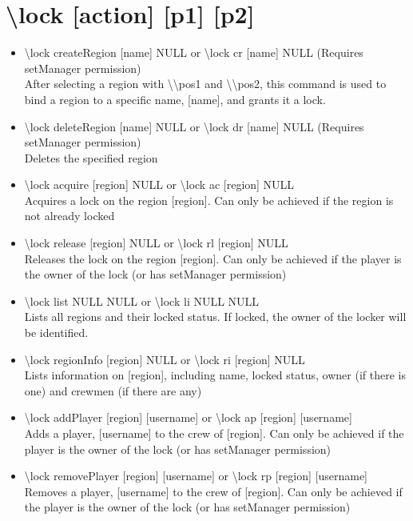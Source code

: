 \documentclass[a4paper,twoside,notitlepage,11pt]{article}
\begin{document}
\section{\textbackslash lock [action] [p1] [p2]}
\begin{itemize}
\item \textbackslash lock createRegion [name] NULL or \textbackslash lock cr [name] NULL (Requires setManager permission)\\
After selecting a region with \textbackslash\textbackslash pos1 and \textbackslash\textbackslash pos2, this command is used to bind a region to a specific name, [name], and grants it a lock.
\item \textbackslash lock deleteRegion [name] NULL or \textbackslash lock dr [name] NULL (Requires setManager permission)\\
Deletes the specified region
\item \textbackslash lock acquire [region] NULL or \textbackslash lock ac [region] NULL\\
Acquires a lock on the region [region]. Can only be achieved if the region is not already locked
\item \textbackslash lock release [region] NULL or \textbackslash lock rl [region] NULL\\
Releases the lock on the region [region]. Can only be achieved if the player is the owner of the lock (or has setManager permission)
\item \textbackslash lock list NULL NULL or \textbackslash lock li NULL NULL\\
Lists all regions and their locked status. If locked, the owner of the locker will be identified.
\item \textbackslash lock regionInfo [region] NULL or \textbackslash lock ri [region] NULL \\
Lists information on [region], including name, locked status, owner (if there is one) and crewmen (if there are any)
\item \textbackslash lock addPlayer [region] [username] or \textbackslash lock ap [region] [username]\\
Adds a player, [username] to the crew of [region]. Can only be achieved if the player is the owner of the lock (or has setManager permission)
\item \textbackslash lock removePlayer [region] [username] or \textbackslash lock rp [region] [username]\\
Removes a player, [username] to the crew of [region]. Can only be achieved if the player is the owner of the lock (or has setManager permission)

\end{itemize}
\end{document}
